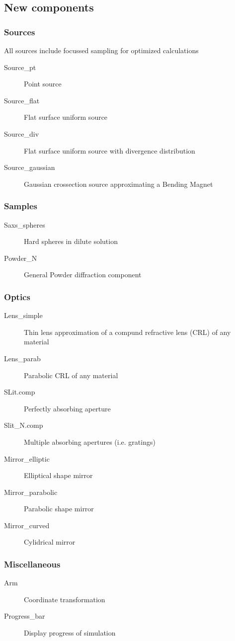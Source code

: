 \subsection{New components}

\subsubsection*{Sources}  
All sources include focussed sampling for optimized calculations
\begin{description}
\item[Source\_pt] Point source
\item[Source\_flat] Flat surface uniform source
\item[Source\_div] Flat surface uniform source with divergence distribution
\item[Source\_gaussian] Gaussian crossection source approximating a Bending Magnet
\end{description}
\subsubsection*{Samples}
\begin{description}
\item[Saxs\_spheres] Hard spheres in dilute solution
\item[Powder\_N] General Powder diffraction component
\end{description}
\subsubsection*{Optics}
\begin{description}
\item[Lens\_simple] Thin lens approximation of a compund refractive lens (CRL) of any material
\item[Lens\_parab] Parabolic CRL of any material
\item[SLit.comp] Perfectly absorbing aperture
\item[Slit\_N.comp] Multiple absorbing apertures (i.e. gratings)
\item[Mirror\_elliptic] Elliptical shape mirror
\item[Mirror\_parabolic] Parabolic shape mirror
\item[Mirror\_curved] Cylidrical mirror
\end{description}
\subsubsection*{Miscellaneous}
\begin{description}
\item[Arm] Coordinate transformation
\item[Progress\_bar] Display progress of simulation
\end{description}
